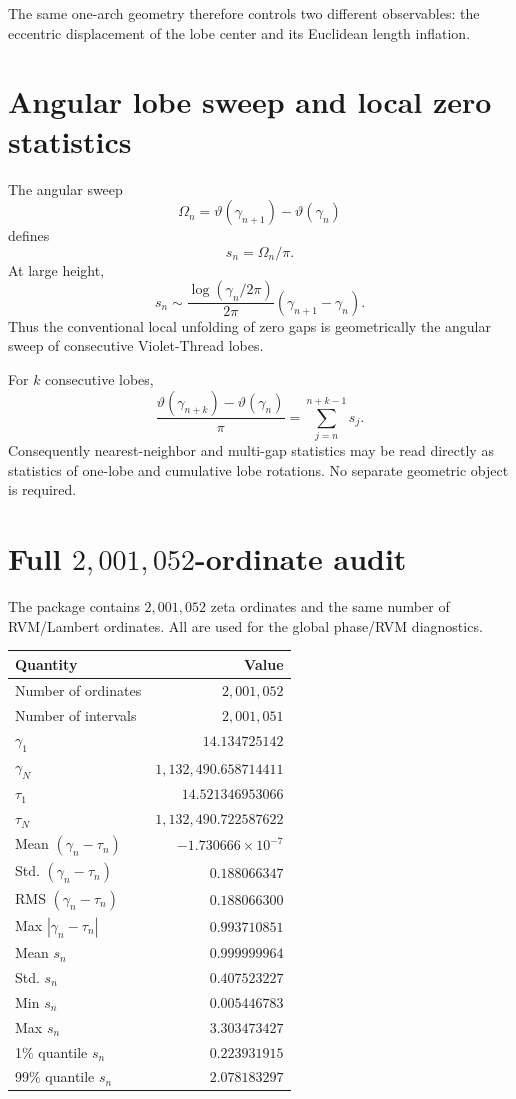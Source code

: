 \documentclass[11pt]{article}
\theoremstyle{definition}
\begin{document}
The same one-arch geometry therefore controls two different observables:
the eccentric displacement of the lobe center and its Euclidean length
inflation.

\section{Angular lobe sweep and local zero statistics}

The angular sweep
\[
\Omega_n
=
\vartheta(\gamma_{n+1})-\vartheta(\gamma_n)
\]
defines
\[
\boxed{s_n=\Omega_n/\pi.}
\]
At large height,
\[
s_n
\sim
\frac{\log(\gamma_n/2\pi)}{2\pi}
(\gamma_{n+1}-\gamma_n).
\]
Thus the conventional local unfolding of zero gaps is geometrically the
angular sweep of consecutive Violet-Thread lobes.

For $k$ consecutive lobes,
\[
\boxed{
\frac{\vartheta(\gamma_{n+k})-\vartheta(\gamma_n)}{\pi}
=
\sum_{j=n}^{n+k-1}s_j.
}
\]
Consequently nearest-neighbor and multi-gap statistics may be read directly
as statistics of one-lobe and cumulative lobe rotations.  No separate
geometric object is required.

\section{Full $2{,}001{,}052$-ordinate audit}

The package contains $2{,}001{,}052$ zeta ordinates and the same number of
RVM/Lambert ordinates.  All are used for the global phase/RVM diagnostics.

\begin{center}
\begin{tabular}{lr}
\toprule
Quantity & Value\\
\midrule
Number of ordinates & $2{,}001{,}052$\\
Number of intervals & $2{,}001{,}051$\\
$\gamma_1$ & $14.134725142$\\
$\gamma_N$ & $1{,}132{,}490.658714411$\\
$\tau_1$ & $14.521346953066$\\
$\tau_N$ & $1{,}132{,}490.722587622$\\
Mean $(\gamma_n-\tau_n)$ & $-1.730666\times10^{-7}$\\
Std. $(\gamma_n-\tau_n)$ & $0.188066347$\\
RMS $(\gamma_n-\tau_n)$ & $0.188066300$\\
Max $|\gamma_n-\tau_n|$ & $0.993710851$\\
Mean $s_n$ & $0.999999964$\\
Std. $s_n$ & $0.407523227$\\
Min $s_n$ & $0.005446783$\\
Max $s_n$ & $3.303473427$\\
1\% quantile $s_n$ & $0.223931915$\\
99\% quantile $s_n$ & $2.078183297$\\
\bottomrule
\end{tabular}
\end{center}
\end{document}
